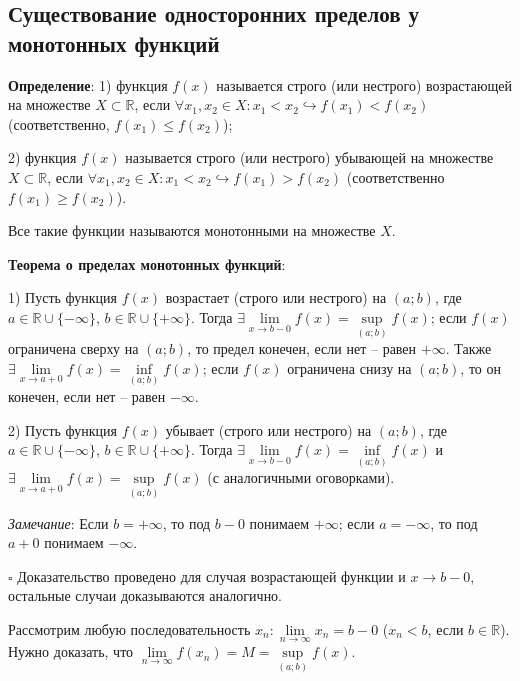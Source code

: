 \documentclass[12pt, a4paper, reqno]{article}
\begin{document}
\subsection{Существование односторонних пределов у монотонных функций}

    \textbf{Определение}: 1) функция $f(x)$ называется строго (или нестрого) возрастающей на множестве
    $X\subset\mathbb{R}$, если $\forall x_1, x_2\in X: x_1 < x_2\hookrightarrow f(x_1) < f(x_2)$
    (соответственно, $f(x_1) \leq f(x_2)$);

    2) функция $f(x)$ называется строго (или нестрого)
    убывающей на множестве $X\subset\mathbb{R}$, если $\forall x_1, x_2\in X: x_1 < x_2
    \hookrightarrow f(x_1) > f(x_2)$ (соответственно $f(x_1) \geq f(x_2)$).

    Все такие функции называются монотонными на множестве $X$.

    \textbf{Теорема о пределах монотонных функций}:

    1) Пусть функция $f(x)$ возрастает (строго или нестрого) на $(a; b)$, где
    $a\in\mathbb{R}\cup\{-\infty\}$, $b\in\mathbb{R}\cup\{+\infty\}$. Тогда
    $\exists\lim\limits_{x\to b - 0} f(x) = \sup\limits_{(a; b)} f(x)$; если $f(x)$ ограничена
    сверху на $(a; b)$, то предел конечен, если нет -- равен $+\infty$. Также
    $\exists\lim\limits_{x\to a + 0} f(x) = \inf\limits_{(a; b)} f(x)$; если $f(x)$ ограничена снизу
    на $(a; b)$, то он конечен, если нет -- равен $-\infty$.

    2) Пусть функция $f(x)$ убывает (строго или нестрого) на $(a; b)$, где
    $a\in\mathbb{R}\cup\{-\infty\}$, $b\in\mathbb{R}\cup\{+\infty\}$. Тогда
    $\exists\lim\limits_{x\to b - 0} f(x) = \inf\limits_{(a; b)} f(x)$ и
    $\exists\lim\limits_{x\to a + 0} f(x) = \sup\limits_{(a; b)} f(x)$ (с аналогичными оговорками).

    \textit{Замечание}: Если $b = +\infty$, то под $b - 0$ понимаем $+\infty$; если $a = -\infty$,
    то под $a + 0$ понимаем $-\infty$.

    $\square$ Доказательство проведено для случая возрастающей функции и $x\to b - 0$, остальные
    случаи доказываются аналогично.

    Рассмотрим любую последовательность $x_n: \lim\limits_{n\to\infty} x_n = b - 0$ ($x_n < b$,
    если $b\in\mathbb{R}$). Нужно доказать, что $\lim\limits_{n\to\infty} f(x_n) = M =
    \sup\limits_{(a; b)} f(x)$.
\end{document}
